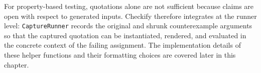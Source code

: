 \skipM For property-based testing, quotations alone are not sufficient because
claims are open with respect to generated inputs. Checkify therefore integrates
at the runner level: \texttt{CaptureRunner} records the original and shrunk
counterexample arguments so that the captured quotation can be instantiated,
rendered, and evaluated in the concrete context of the failing assignment. The
implementation details of these helper functions and their formatting choices are
covered later in this chapter.


